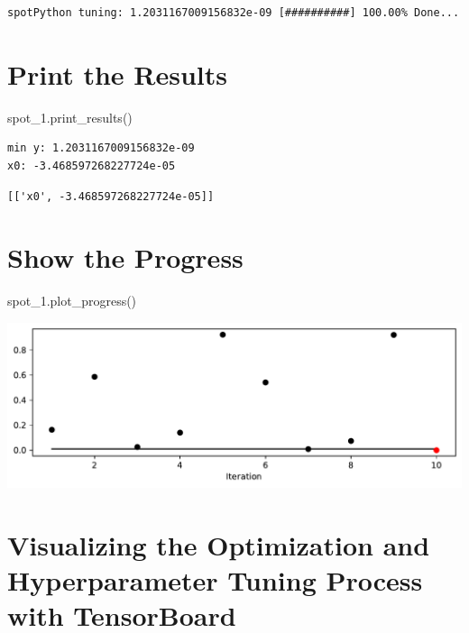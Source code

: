 \documentclass[
  letterpaper,
  DIV=11,
  numbers=noendperiod]{scrreprt}
\newenvironment{Shaded}{\begin{snugshade}}{\end{snugshade}}
\newcommand{\NormalTok}[1]{\textcolor[rgb]{0.00,0.23,0.31}{#1}}
\begin{document}
\begin{verbatim}
spotPython tuning: 1.2031167009156832e-09 [##########] 100.00% Done...
\end{verbatim}

\section{Print the Results}\label{print-the-results-1}

\begin{Shaded}
\begin{Highlighting}[]
\NormalTok{spot\_1.print\_results()}
\end{Highlighting}
\end{Shaded}

\begin{verbatim}
min y: 1.2031167009156832e-09
x0: -3.468597268227724e-05
\end{verbatim}

\begin{verbatim}
[['x0', -3.468597268227724e-05]]
\end{verbatim}

\section{Show the Progress}\label{show-the-progress-1}

\begin{Shaded}
\begin{Highlighting}[]
\NormalTok{spot\_1.plot\_progress()}
\end{Highlighting}
\end{Shaded}

\includegraphics{007_num_spot_intro_files/figure-pdf/cell-11-output-1.pdf}

\section{Visualizing the Optimization and Hyperparameter Tuning Process
with TensorBoard}\label{sec-visualizing-tensorboard-01}
\end{document}
